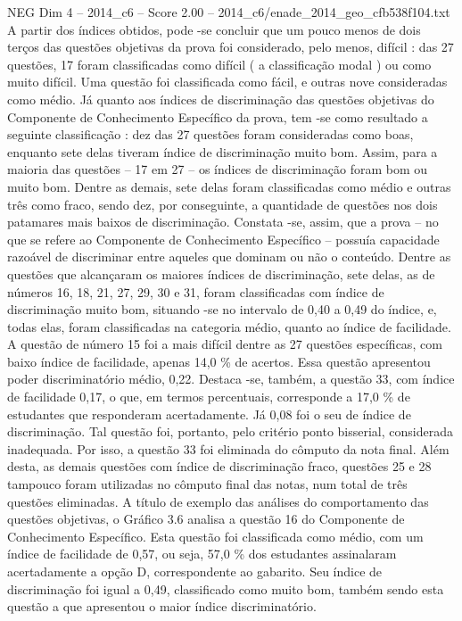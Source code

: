 \begin{textsample}{NEG Dim 4 – 2014\_c6 – Score 2.00 – 2014\_c6/enade\_2014\_geo\_cfb538f104.txt}
A partir dos índices obtidos, pode -se concluir que um pouco menos de dois terços das questões objetivas da prova foi considerado, pelo menos, difícil : das 27 questões, 17 foram classificadas como difícil ( a classificação modal ) ou como muito difícil.
Uma questão foi classificada como fácil, e outras nove consideradas como médio.
Já quanto aos índices de discriminação das questões objetivas do Componente de Conhecimento Específico da prova, tem -se como resultado a seguinte classificação : dez das 27 questões foram consideradas como boas, enquanto sete delas tiveram índice de discriminação muito bom.
Assim, para a maioria das questões – 17 em 27 – os índices de discriminação foram bom ou muito bom.
Dentre as demais, sete delas foram classificadas como médio e outras três como fraco, sendo dez, por conseguinte, a quantidade de questões nos dois patamares mais baixos de discriminação.
Constata -se, assim, que a prova – no que se refere ao Componente de Conhecimento Específico – possuía capacidade razoável de discriminar entre aqueles que dominam ou não o conteúdo.
Dentre as questões que alcançaram os maiores índices de discriminação, sete delas, as de números 16, 18, 21, 27, 29, 30 e 31, foram classificadas com índice de discriminação muito bom, situando -se no intervalo de 0,40 a 0,49 do índice, e, todas elas, foram classificadas na categoria médio, quanto ao índice de facilidade.
A questão de número 15 foi a mais difícil dentre as 27 questões específicas, com baixo índice de facilidade, apenas 14,0 \% de acertos.
Essa questão apresentou poder discriminatório médio, 0,22.
Destaca -se, também, a questão 33, com índice de facilidade 0,17, o que, em termos percentuais, corresponde a 17,0 \% de estudantes que responderam acertadamente.
Já 0,08 foi o seu de índice de discriminação.
Tal questão foi, portanto, pelo critério ponto bisserial, considerada inadequada.
Por isso, a questão 33 foi eliminada do cômputo da nota final.
Além desta, as demais questões com índice de discriminação fraco, questões 25 e 28 tampouco foram utilizadas no cômputo final das notas, num total de três questões eliminadas.
A título de exemplo das análises do comportamento das questões objetivas, o Gráfico 3.6 analisa a questão 16 do Componente de Conhecimento Específico.
Esta questão foi classificada como médio, com um índice de facilidade de 0,57, ou seja, 57,0 \% dos estudantes assinalaram acertadamente a opção D, correspondente ao gabarito.
Seu índice de discriminação foi igual a 0,49, classificado como muito bom, também sendo esta questão a que apresentou o maior índice discriminatório.

\end{textsample}
